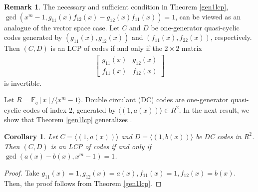 \documentclass[12 pt]{extarticle}
\numberwithin{equation}{section}
\newtheorem{corollary}[theorem]{Corollary}
\theoremstyle{definition}
\newtheorem{remark}{Remark}[section]
\begin{document}
\begin{remark}
	The necessary and sufficient condition in Theorem \ref{gen1lcp}, $\gcd(x^m-1,g_{11}(x)f_{12}(x)-g_{12}(x)f_{11}(x))= 1$, can be viewed as an analogue of the vector space case. Let $C$ and $D$ be one-generator quasi-cyclic codes generated by $(g_{11}(x),g_{12}(x))$ and $(f_{11}(x),f_{22}(x))$, respectively. Then $(C,D)$ is an LCP of codes if and only if the $2\times 2$ matrix 
		\begin{align*}
			\begin{bmatrix}
				g_{11}(x) & g_{12}(x)\\
				f_{11}(x) & f_{12}(x)				
			\end{bmatrix}
		\end{align*}
		is invertible.
\end{remark}


Let $R=\mathbb{F}_q[x]/\langle x^m-1\rangle$. Double circulant (DC) codes are one-generator quasi-cyclic codes of index $2$,   generated by $\langle (1,a(x))\rangle\in R^2$. In the next result, we show that Theorem \ref{gen1lcp} generalizes \cite[Proposition 3.2]{carlet2018}. 
\begin{corollary}
  Let $C=\langle (1,a(x))\rangle$ and $D=\langle (1,b(x))\rangle$  be DC codes in $R^2$. Then $(C,D)$ is an LCP of codes if and only
 if $\gcd(a(x)-b(x),x^m-1)=1$.
\end{corollary}
\begin{proof}
    Take $g_{11}(x)=1, g_{12}(x)=a(x), f_{11}(x)=1, f_{12}(x)=b(x)$. Then, the proof follows from Theorem \ref{gen1lcp}.
\end{proof}
\end{document}
